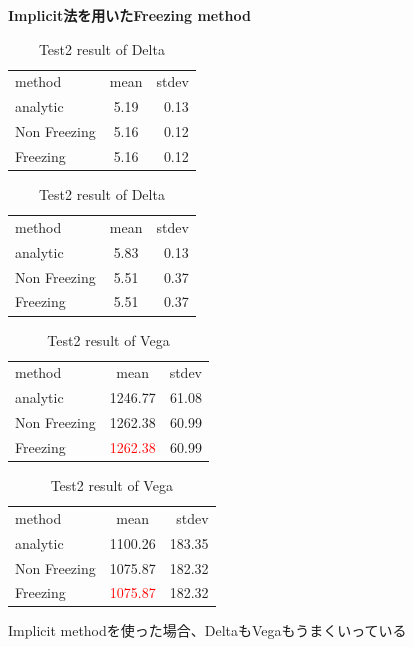 \documentclass[driverfallback=dvipdfmx,cjk]{beamer}
\begin{document}
\begin{frame}\textbf{Implicit法を用いたFreezing method}
    \begin{table}[htb]
        \centering
        \begin{minipage}[t]{.45\textwidth}
            \caption{Test1 result of Delta}           
            \begin{tabular}{lcr}
                \hline
                method & mean & stdev \\
                analytic & 5.19& 0.13 \\
                Non Freezing & 5.16 & 0.12\\
                Freezing & 5.16 & 0.12
            \end{tabular}
        \end{minipage}
        \hfill
        \begin{minipage}[t]{.45\textwidth}
            \caption{Test2 result of Delta}           
            \begin{tabular}{lcr}
                \hline
                method & mean & stdev \\
                analytic & 5.83 & 0.13 \\
                Non Freezing & 5.51 & 0.37\\
                Freezing & 5.51 & 0.37
            \end{tabular}
        \end{minipage}
    \end{table}
    \begin{table}[htb]
        \centering
        \begin{minipage}[t]{.45\textwidth}
            \caption{Test1 result of Vega}           
            \begin{tabular}{lcr}
                \hline
                method & mean & stdev \\
                analytic & 1246.77& 61.08 \\
                Non Freezing & 1262.38 & 60.99\\
                Freezing & \textcolor{red}{1262.38} & 60.99
            \end{tabular}
        \end{minipage}
        \hfill
        \begin{minipage}[t]{.45\textwidth}
            \caption{Test2 result of Vega}           
            \begin{tabular}{lcr}
                \hline
                method & mean & stdev \\
                analytic & 1100.26 & 183.35\\
                Non Freezing & 1075.87 & 182.32\\
                Freezing & \textcolor{red}{1075.87} & 182.32
            \end{tabular}
        \end{minipage}
    \end{table}
    Implicit methodを使った場合、DeltaもVegaもうまくいっている
\end{frame}
\end{document}
